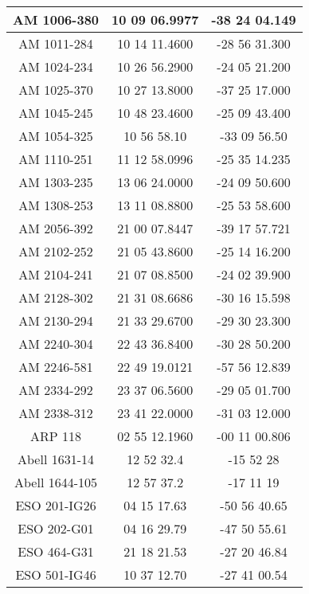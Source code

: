 \begin{apendicesenv}
\begin{longtable}{|c|c|c|}
            AM 1006-380 & 10 09 06.9977 & -38 24 04.149 \\ \hline
            AM 1011-284 & 10 14 11.4600 & -28 56 31.300 \\ \hline
            AM 1024-234 & 10 26 56.2900 & -24 05 21.200 \\ \hline
            AM 1025-370 & 10 27 13.8000 & -37 25 17.000 \\ \hline
            AM 1045-245 & 10 48 23.4600 & -25 09 43.400 \\ \hline
            AM 1054-325 & 10 56 58.10 & -33 09 56.50 \\ \hline
            AM 1110-251 & 11 12 58.0996 & -25 35 14.235 \\ \hline
            AM 1303-235 & 13 06 24.0000 & -24 09 50.600 \\ \hline
            AM 1308-253 & 13 11 08.8800 & -25 53 58.600 \\ \hline
            AM 2056-392 & 21 00 07.8447 & -39 17 57.721 \\ \hline
            AM 2102-252 & 21 05 43.8600 & -25 14 16.200 \\ \hline
            AM 2104-241 & 21 07 08.8500 & -24 02 39.900 \\ \hline
            AM 2128-302 & 21 31 08.6686 & -30 16 15.598 \\ \hline
            AM 2130-294 & 21 33 29.6700 & -29 30 23.300 \\ \hline
            AM 2240-304 & 22 43 36.8400 & -30 28 50.200 \\ \hline
            AM 2246-581 & 22 49 19.0121 & -57 56 12.839 \\ \hline
            AM 2334-292 & 23 37 06.5600 & -29 05 01.700 \\ \hline
            AM 2338-312 & 23 41 22.0000 & -31 03 12.000 \\ \hline
            ARP 118 & 02 55 12.1960 & -00 11 00.806 \\ \hline
            Abell 1631-14 & 12 52 32.4 & -15 52 28 \\ \hline
            Abell 1644-105 & 12 57 37.2 & -17 11 19 \\ \hline
            ESO 201-IG26 & 04 15 17.63 & -50 56 40.65 \\ \hline
            ESO 202-G01 & 04 16 29.79 & -47 50 55.61 \\ \hline
            ESO 464-G31 & 21 18 21.53 & -27 20 46.84 \\ \hline
            ESO 501-IG46 & 10 37 12.70 & -27 41 00.54 \\ \hline

\end{longtable}
\end{apendicesenv}
